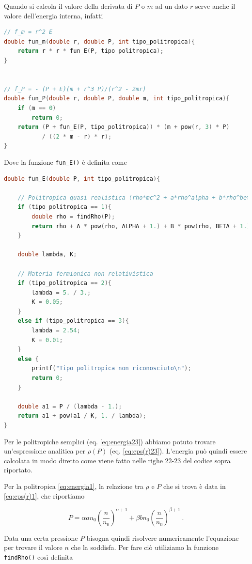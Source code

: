 \documentclass[a4paper, titlepage]{article}
\begin{document}
Quando si calcola il valore della derivata di $P$ o $m$ ad un dato $r$ serve
anche il valore dell'energia interna, infatti
\begin{lstlisting}[language=C]
// f_m = r^2 E
double fun_m(double r, double P, int tipo_politropica){
    return r * r * fun_E(P, tipo_politropica);
}


// f_P = - (P + E)(m + r^3 P)/(r^2 - 2mr)
double fun_P(double r, double P, double m, int tipo_politropica){
    if (m == 0)
        return 0;
    return (P + fun_E(P, tipo_politropica)) * (m + pow(r, 3) * P)
           / ((2 * m - r) * r);
}
\end{lstlisting}
Dove la funzione \texttt{fun\_E()} è definita come
\begin{lstlisting}[language=C]
double fun_E(double P, int tipo_politropica){

    // Politropica quasi realistica (rho*mc^2 + a*rho^alpha + b*rho^beta)
    if (tipo_politropica == 1){
        double rho = findRho(P);
        return rho + A * pow(rho, ALPHA + 1.) + B * pow(rho, BETA + 1.);
    }

    double lambda, K;

    // Materia fermionica non relativistica
    if (tipo_politropica == 2){
        lambda = 5. / 3.;
        K = 0.05;
    }
    else if (tipo_politropica == 3){
        lambda = 2.54;
        K = 0.01;
    }
    else {
        printf("Tipo politropica non riconosciuto\n");
        return 0;
    }

    double a1 = P / (lambda - 1.);
    return a1 + pow(a1 / K, 1. / lambda);
}
\end{lstlisting}

Per le politropiche semplici (eq. \ref{eq:energia23}) abbiamo potuto trovare
un'espressione analitica per $\rho (P)$ (eq. \ref{eq:eps(r)23}).
L'energia può quindi essere calcolata in modo diretto come viene fatto nelle
righe 22-23 del codice sopra riportato.

Per la politropica \ref{eq:energia1}, la relazione tra $\rho$ e $P$ che si trova
è data in \ref{eq:eps(r)1}, che riportiamo

\begin{equation}
        P = \alpha a n_0 \left( \frac{n}{n_0} \right)^{\alpha + 1}
        + \beta b n_0 \left( \frac{n}{n_0} \right)^{\beta + 1} \ .
        \label{ap:eq:1}
\end{equation}

Data una certa pressione $P$ bisogna quindi risolvere numericamente l'equazione
per trovare il valore $n$ che la soddisfa.
Per fare ciò utiliziamo la funzione \texttt{findRho()} così definita
\end{document}
